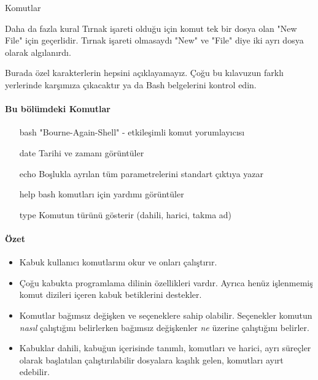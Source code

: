 \begin{section}{Komutlar}
\begin{subsection}{Daha da fazla kural}
Tırnak işareti olduğu için komut tek bir dosya olan "New File" için geçerlidir. Tırnak işareti olmasaydı "New" ve "File" diye iki ayrı dosya olarak algılanırdı.

Burada özel karakterlerin hepsini açıklayamayız. Çoğu bu kılavuzun farklı yerlerinde karşımıza çıkacaktır ya da Bash belgelerini kontrol edin.

\paragraph{Bu bölümdeki Komutlar}{
\begin{itemize}
\item[bash] 	"Bourne-Again-Shell" - etkileşimli komut yorumlayıcısı
\item[date] 	Tarihi ve zamanı görüntüler
\item[echo] 	Boşlukla ayrılan tüm parametrelerini standart çıktıya yazar
\item[help]		bash komutları için yardımı görüntüler
\item[type] 	Komutun türünü gösterir (dahili, harici, takma ad)
\end{itemize}}
\paragraph{Özet}{
\begin{itemize}
\item Kabuk kullanıcı komutlarını okur ve onları çalıştırır.
\item Çoğu kabukta programlama dilinin özellikleri vardır. Ayrıca henüz işlenmemiş komut dizileri içeren kabuk betiklerini destekler.
\item Komutlar bağımsız değişken ve seçeneklere sahip olabilir. Seçenekler komutun \emph{nasıl} çalıştığını belirlerken bağımsız değişkenler \emph{ne} üzerine çalıştığını belirler.
\item Kabuklar dahili, kabuğun içerisinde tanımlı, komutları ve harici, ayrı süreçler olarak başlatılan çalıştırılabilir dosyalara kaşılık gelen, komutları ayırt edebilir.
\end{itemize}}
\end{subsection}
\end{section}
